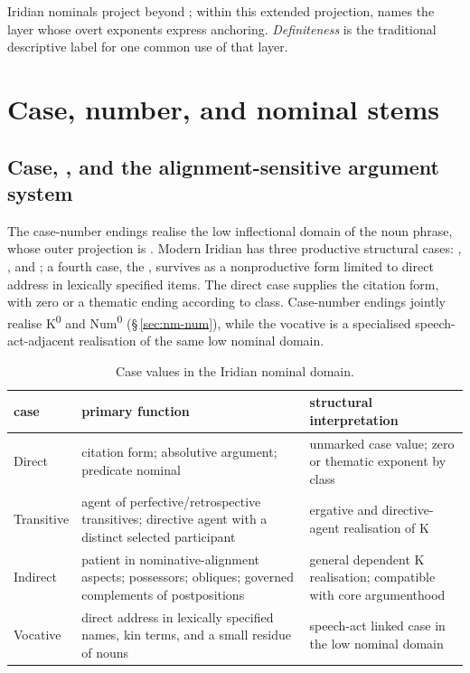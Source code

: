 Iridian nominals project beyond ; within this extended projection,
 names the layer whose overt exponents express anchoring.
\emph{Definiteness} is the traditional descriptive label for one common use of
that layer.

\FloatBarrier

\section{Case, number, and nominal stems}
\label{sec:nm-case}

\subsection{Case, , and the alignment-sensitive argument system}
\label{sec:nm-case-system}

The case-number endings realise the low inflectional domain of the noun
phrase, whose outer projection is . Modern Iridian has three productive
structural cases: ,
, and ; a fourth case, the ,
survives as a nonproductive form limited to direct address in lexically
specified items. The direct case supplies the citation form, with zero or a thematic ending
according to class. Case-number endings jointly realise
K\textsuperscript{0} and Num\textsuperscript{0}
(§\,\ref{sec:nm-num}), while the vocative is a specialised
speech-act-adjacent realisation of the same low nominal domain.

\begin{table}
  \footnotesize
  \caption{Case values in the Iridian nominal domain.}
  \label{tab:nm-cases}
  \begin{tabularx}{\textwidth}{l L L}
    \toprule
    {\sc case} & {\sc primary function} & {\sc structural interpretation} \\
    \midrule
    Direct & citation form; absolutive argument; predicate nominal &
    unmarked case value; zero or thematic exponent by class \\
    Transitive & agent of perfective/retrospective transitives;
    directive agent with a distinct selected participant &
    ergative and directive-agent realisation of K \\
    Indirect & patient in nominative-alignment aspects; possessors;
    obliques; governed complements of postpositions &
    general dependent K realisation; compatible with core argumenthood \\
    Vocative & direct address in lexically specified names, kin
    terms, and a small residue of nouns &
    speech-act linked case in the low nominal domain \\
    \bottomrule
  \end{tabularx}
\end{table}

